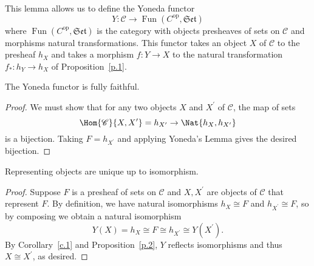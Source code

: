 \documentclass[10pt]{amsart}
\begin{document}
This lemma allows us to define the Yoneda functor
$$Y : \mathscr{C} \rightarrow \operatorname{Fun}(C^\text{op}, \mathfrak{Set})$$
where $\operatorname{Fun}(C^\text{op}, \mathfrak{Set})$ is the category with objects presheaves of sets on $\mathscr{C}$ and morphisms natural transformations.
This functor takes an object $X$ of $\mathscr{C}$ to the presheaf $h_X$ and takes a morphism $f : Y \rightarrow X$ to the natural transformation $f_* : h_Y \rightarrow h_X$ of Proposition~\ref{p.1}.

\begin{cor}\label{c.1}
  The Yoneda functor is fully faithful.

  \begin{proof}
    We must show that for any two objects $X$ and $X^\prime$ of $\mathscr{C}$, the map of sets
    $$\Hom{\mathscr{C}}{X,X^\prime} = h_{X^\prime} \rightarrow \Nat{h_X,h_{X^\prime}}$$
      is a bijection.
      Taking $F = h_{X^\prime}$ and applying Yoneda's Lemma gives the desired bijection.
  \end{proof}
\end{cor}

\begin{cor}
  Representing objects are unique up to isomorphism.

  \begin{proof}
    Suppose $F$ is a presheaf of sets on $\mathscr{C}$ and $X, X^\prime$ are objects of $\mathscr{C}$ that represent $F$.
    By definition, we have natural isomorphisms $h_X \cong F$ and $h_{X^\prime} \cong F$, so by composing we obtain a natural isomorphism
    $$Y(X) = h_X \cong F \cong h_{X^\prime} \cong Y(X^\prime).$$
    By Corollary~\ref{c.1} and Proposition~\ref{p.2}, $Y$ reflects isomorphisms and thus $X \cong X^\prime$, as desired.
  \end{proof}
\end{cor}
\end{document}
